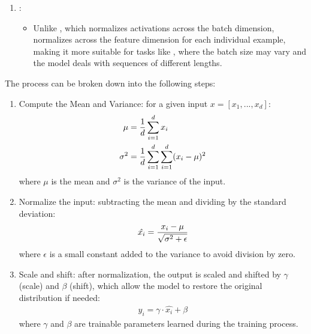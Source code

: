 \documentclass[letterpaper,11pt,english]{sphinxmanual}
\begin{document}
\begin{enumerate}
\begin{itemize}
\end{itemize}

\item {} 
\sphinxAtStartPar
{}:
\begin{itemize}
\item {} 
\sphinxAtStartPar
Unlike , which normalizes activations across
the batch dimension,  normalizes across the
feature dimension for each individual example, making it more
suitable for tasks like , where the batch size
may vary and the model deals with sequences of different lengths.

\end{itemize}

\end{enumerate}

\sphinxAtStartPar
The process can be broken down into the following steps:
\begin{enumerate}
%
\item {} 
\sphinxAtStartPar
Compute the Mean and Variance: for a given input
\(x = [x_1, ..., x_d]\):
\begin{equation*}
\begin{split}\mu &= {1\over d} \sum^d_{i=1}x_i\\
\sigma^2 &= {1\over d} \sum^d_{i=1} \sum^d_{i=1} (x_i-\mu)^2\end{split}
\end{equation*}
\sphinxAtStartPar
where \(\mu\) is the mean and \(\sigma^2\) is the variance of
the input.

\item {} 
\sphinxAtStartPar
Normalize the input: subtracting the mean and dividing by the
standard deviation:
\begin{equation*}
\begin{split}\hat{x_i} = { x_i - \mu \over \sqrt{\sigma^2 + \epsilon}}\end{split}
\end{equation*}
\sphinxAtStartPar
where \(\epsilon\) is a small constant added to the variance to
avoid division by zero.

\item {} 
\sphinxAtStartPar
Scale and shift: after normalization, the output is scaled and
shifted by  \(\gamma\) (scale) and
\(\beta\) (shift), which allow the model to restore the original
distribution if needed:
\begin{equation*}
\begin{split}y_i = \gamma \cdot \hat{x_i} + \beta\end{split}
\end{equation*}
\sphinxAtStartPar
where \(\gamma\) and \(\beta\) are trainable parameters
learned during the training process.

\end{enumerate}
\end{document}
